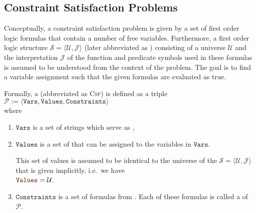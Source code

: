 \subsection{Constraint Satisfaction Problems}
Conceptually, a constraint satisfaction problem is given by a set of first order logic formulas that contain a
number of free variables.  Furthermore, a first order logic structure $\mathcal{S} = \langle \mathcal{U},
\mathcal{J}\rangle $
(later abbreviated as )
consisting of a universe $\mathcal{U}$ and the interpretation $\mathcal{J}$ of the function and predicate 
symbols used in these formulas is assumed to be understood from the context of the problem.  The goal is 
to find a variable assignment such that the given formulas are evaluated as true.

\begin{Definition}[CSP]  \hspace*{\fill} \linebreak
Formally, a   (abbreviated as
\textsc{Csp}) is defined as a triple 
\\[0.2cm]
\hspace*{1.3cm}
$\mathcal{P} := \langle \mathtt{Vars}, \mathtt{Values}, \mathtt{Constraints} \rangle$
\\[0.2cm]
where
\begin{enumerate}
\item $\mathtt{Vars}$ is a set of strings which serve as ,
\item $\mathtt{Values}$ is a set of  that can be assigned to the variables in $\mathtt{Vars}$.

      This set of values is assumed to be identical to the universe of the 
      $\mathcal{S} = \langle \mathcal{U}, \mathcal{J} \rangle$ that is given implicitly, i.e.~we have
      \\[0.2cm]
      \hspace*{1.3cm}
      $\mytt{Values} = \mathcal{U}$.
\item $\mathtt{Constraints}$ is a set of formulas from .  Each of these formulas is
      called a  of $\mathcal{P}$.  \eox
\end{enumerate}
\end{Definition}
\vspace*{-0.3cm}

